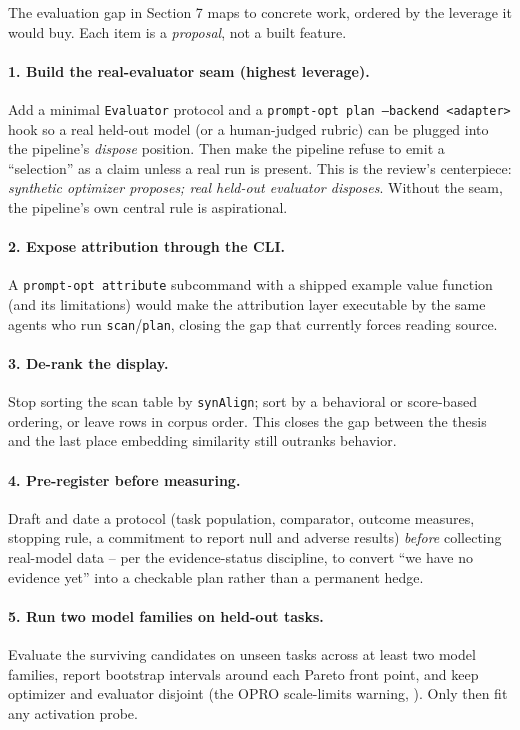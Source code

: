 The evaluation gap in Section 7 maps to concrete work, ordered by the leverage
it would buy. Each item is a \emph{proposal}, not a built feature.

\paragraph{1. Build the real-evaluator seam (highest leverage).}
Add a minimal \texttt{Evaluator} protocol and a \texttt{prompt-opt plan
--backend <adapter>} hook so a real held-out model (or a human-judged rubric)
can be plugged into the pipeline's \emph{dispose} position. Then make the
pipeline refuse to emit a ``selection'' as a claim unless a real run is present.
This is the review's centerpiece: \emph{synthetic optimizer proposes; real
held-out evaluator disposes}. Without the seam, the pipeline's own central rule
is aspirational.

\paragraph{2. Expose attribution through the CLI.}
A \texttt{prompt-opt attribute} subcommand with a shipped example value function
(and its limitations) would make the attribution layer executable by the same
agents who run \texttt{scan}/\texttt{plan}, closing the gap that currently
forces reading source.

\paragraph{3. De-rank the display.}
Stop sorting the scan table by \texttt{synAlign}; sort by a behavioral or
score-based ordering, or leave rows in corpus order. This closes the gap between
the thesis and the last place embedding similarity still outranks behavior.

\paragraph{4. Pre-register before measuring.}
Draft and date a protocol (task population, comparator, outcome measures,
stopping rule, a commitment to report null and adverse results) \emph{before}
collecting real-model data -- per the evidence-status discipline, to convert
``we have no evidence yet'' into a checkable plan rather than a permanent hedge.

\paragraph{5. Run two model families on held-out tasks.}
Evaluate the surviving candidates on unseen tasks across at least two model
families, report bootstrap intervals around each Pareto front point, and keep
optimizer and evaluator disjoint (the OPRO scale-limits warning,
\citet{zhang2024reoprolim}). Only then fit any activation probe.

